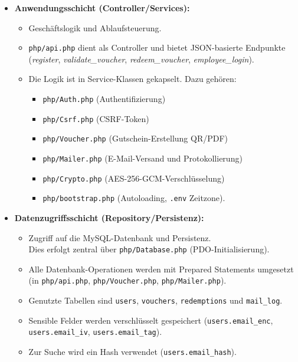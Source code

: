 \begin{itemize}
  \item \textbf{Anwendungsschicht (Controller/Services):} 
    \renewcommand{\labelitemii}{$\rightarrow$} %
  \begin{itemize}
    \item Geschäftslogik und Ablaufsteuerung.  
    \item\texttt{php/api.php} dient als Controller und bietet \ac{JSON}-basierte Endpunkte (\zB \textit{register}, \textit{validate\_voucher}, \textit{redeem\_voucher}, \textit{employee\_login}).  
    \item Die Logik ist in Service-Klassen gekapselt. Dazu gehören:  
      \begin{itemize} 
        \item \texttt{php/Auth.php} (Authentifizierung)
        \item \texttt{php/Csrf.php} (\ac{CSRF}-Token)  
        \item \texttt{php/Voucher.php} (Gutschein-Erstellung \inkl QR/PDF)
        \item \texttt{php/Mailer.php} (E-Mail-Versand und Protokollierung)
        \item \texttt{php/Crypto.php} (\ac{AES}-256-GCM-Verschlüsselung)
        \item \texttt{php/bootstrap.php} (Autoloading, \texttt{.env} Zeitzone).
      \end{itemize}
  \end{itemize}
\newpage
  \item \textbf{Datenzugriffsschicht (Repository/Persistenz):} 
      \renewcommand{\labelitemii}{$\rightarrow$} %
      \begin{itemize} 
        \item Zugriff auf die MySQL-Datenbank und Persistenz.\\  
        Dies erfolgt zentral über \texttt{php/Database.php} (PDO-Initialisierung).  
        \item Alle Datenbank-Operationen werden mit Prepared Statements umgesetzt (\zB in \texttt{php/api.php}, \texttt{php/Voucher.php}, \texttt{php/Mailer.php}).  
        \item Genutzte Tabellen sind \texttt{users}, \texttt{vouchers},  \texttt{redemptions} und \texttt{mail\_log}.  
        \item Sensible Felder werden verschlüsselt gespeichert (\texttt{users.email\_enc}, \texttt{users.email\_iv}, \texttt{users.email\_tag}).  
        \item Zur Suche wird ein Hash verwendet (\texttt{users.email\_hash}).
      \end{itemize}
\end{itemize}

